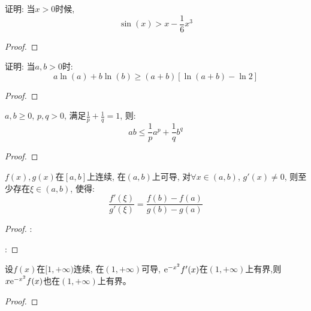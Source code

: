 \begin{example}
    证明: 当$x > 0$时候, 
    \begin{equation*}
        \sin(x) > x - \frac{1}{6}x^3
    \end{equation*}
\end{example}
\begin{proof}
    
\end{proof}

\begin{example}
    证明: 当$a, b > 0$时:
    \begin{equation*}
        a\ln(a) + b\ln(b) \ge (a+b)[\ln(a+b) - \ln2]
    \end{equation*}
\end{example}
\begin{proof}
    
\end{proof}

\begin{example}
    $a, b \ge 0$, $p, q > 0$, 满足$\frac{1}{p} + \frac{1}{q} = 1$, 则:
    \begin{equation*}
        ab \le \frac{1}{p}a^p + \frac{1}{q}b^q
    \end{equation*}    
\end{example}
\begin{proof}

\end{proof}

\begin{theorem}[Cauchy中值定理]\label{theorem:Cauchy-mean-value}
    $f(x), g(x)$在$[a, b]$上连续, 在$(a, b)$上可导, 对$\forall x \in (a, b)$, $g'(x) \neq 0$, 则至少存在$\xi \in (a, b)$, 使得:
    \begin{equation*}
        \frac{f'(\xi)}{g'(\xi)} = \frac{f(b)-f(a)}{g(b) - g(a)}
    \end{equation*}
\end{theorem}
\begin{proof}
    :

    :

\end{proof}

\begin{example}
    设$f(x)$在$[1, +\infty)$连续, 在$(1, +\infty)$可导, $\mathrm{e}^{-x^2}f'(x)$在$(1, +\infty)$上有界,则$x\mathrm{e}^{-x^2}f(x)$也在$(1, +\infty)$上有界。
\end{example}
\begin{proof}
    
\end{proof}

